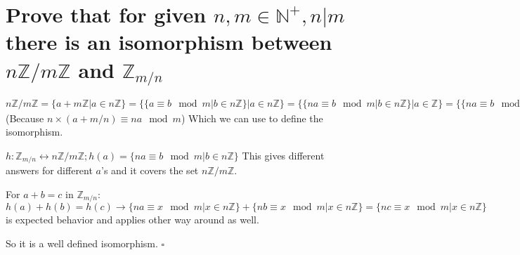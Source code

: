 \documentclass[11pt]{article}
\begin{document}
    \part*{Prove that for given $n, m \in \mathbb{N^+}, n | m$ there is an isomorphism between $n\mathbb{Z}/m\mathbb{Z}$ and $\mathbb{Z}_{m/n}$ }

    $n\mathbb{Z}/m\mathbb{Z} = \{a + m\mathbb{Z} | a \in n\mathbb{Z}\} = \{\{a \equiv b \mod m | b \in n\mathbb{Z}\} | a \in n\mathbb{Z}\} = \{\{na \equiv b \mod m | b \in n\mathbb{Z}\} | a \in \mathbb{Z}\} = \{\{na \equiv b \mod m | b \in n\mathbb{Z}\} | a \in \mathbb{Z}_{m/n}\}$
    (Because $n \times (a + m/n) \equiv na \mod m$)
    Which we can use to define the isomorphism.

    $h: \mathbb{Z}_{m/n} \leftrightarrow n\mathbb{Z}/m\mathbb{Z}; h(a) = \{na \equiv b \mod m | b \in n\mathbb{Z}\}$
    This gives different answers for different $a$'s and it covers the set
    $n\mathbb{Z}/m\mathbb{Z}$.

    For $a + b = c$ in $\mathbb{Z}_{m/n}$: $h(a) + h(b) = h(c) \rightarrow \{na \equiv x \mod m | x \in n\mathbb{Z}\} + \{nb \equiv x \mod m | x \in n\mathbb{Z}\} = \{nc \equiv x \mod m | x \in n\mathbb{Z}\}$ is expected behavior and applies other way around as well.

    So it is a well defined isomorphism. $\square$
\end{document}
